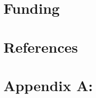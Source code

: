 \documentclass[12pt]{article}
\begin{document}
\section{Funding}


\newpage
\section{References}




\newpage
\section{Appendix A: }



\end{document}

